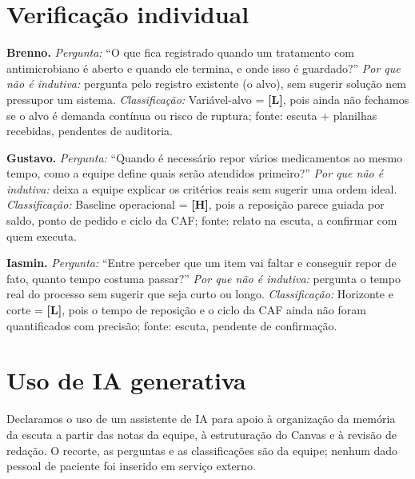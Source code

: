 \documentclass[11pt,a4paper]{article}
\newcommand{\Hh}{\textbf{\textcolor{laranjaH}{[H]}}}
\newcommand{\Ll}{\textbf{\textcolor{vermelhoL}{[L]}}}
\begin{document}
\section{Verificação individual}

\textbf{Brenno.} \emph{Pergunta:} ``O que fica registrado quando um tratamento com antimicrobiano é aberto e quando ele termina, e onde isso é guardado?'' \emph{Por que não é indutiva:} pergunta pelo registro existente (o alvo), sem sugerir solução nem pressupor um sistema. \emph{Classificação:} Variável-alvo = \Ll{}, pois ainda não fechamos se o alvo é demanda contínua ou risco de ruptura; fonte: escuta + planilhas recebidas, pendentes de auditoria.

\textbf{Gustavo.} \emph{Pergunta:} ``Quando é necessário repor vários medicamentos ao mesmo tempo, como a equipe define quais serão atendidos primeiro?'' \emph{Por que não é indutiva:} deixa a equipe explicar os critérios reais sem sugerir uma ordem ideal. \emph{Classificação:} Baseline operacional = \Hh{}, pois a reposição parece guiada por saldo, ponto de pedido e ciclo da CAF; fonte: relato na escuta, a confirmar com quem executa.

\textbf{Iasmin.} \emph{Pergunta:} ``Entre perceber que um item vai faltar e conseguir repor de fato, quanto tempo costuma passar?'' \emph{Por que não é indutiva:} pergunta o tempo real do processo sem sugerir que seja curto ou longo. \emph{Classificação:} Horizonte e corte = \Ll{}, pois o tempo de reposição e o ciclo da CAF ainda não foram quantificados com precisão; fonte: escuta, pendente de confirmação.

\section*{Uso de IA generativa}
Declaramos o uso de um assistente de IA para apoio à organização da memória da escuta a partir das notas da equipe, à estruturação do Canvas e à revisão de redação. O recorte, as perguntas e as classificações são da equipe; nenhum dado pessoal de paciente foi inserido em serviço externo.
\end{document}

